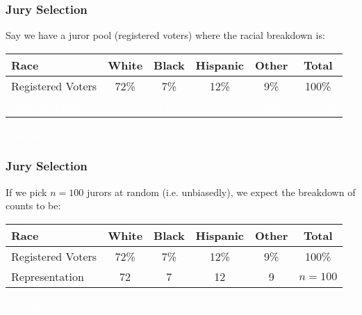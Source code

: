 \documentclass[handout]{beamer}
\newcommand{\blue}[1]{\textcolor{blue2}{#1}}
\newcommand{\white}[1]{\textcolor{white}{#1}}
\begin{document}
\begin{frame}[fragile]
\frametitle{Jury Selection}
Say we have a juror pool (registered voters) where the racial breakdown is:


\begin{center}
\begin{tabular}{l||cccc|c}
Race & White & Black & Hispanic & Other & Total \\ 
\hline
Registered Voters & 72\% & 7\% & 12\% & 9\% & 100\%\\ 
\textcolor{white}{Representation} & \textcolor{white}{0} & \textcolor{white}{0} & \textcolor{white}{0} & \textcolor{white}{100} & \textcolor{white}{$n=100$} \\ 
\end{tabular}
\end{center}

\white{blah blah}


\end{frame}


\begin{frame}[fragile]
\frametitle{Jury Selection}
If we pick $n=100$ jurors \blue{at random} (i.e. unbiasedly), we \blue{expect} the breakdown of counts to be:

\begin{center}
\begin{tabular}{l||cccc|c}
Race & White & Black & Hispanic & Other & Total \\ 
\hline
Registered Voters & 72\% & 7\% & 12\% & 9\% & 100\%\\ 
Representation & 72 & 7 & 12 & 9 & $n=100$ \\ 
\end{tabular}
\end{center}

\white{blah blah}

\end{frame}
\end{document}

